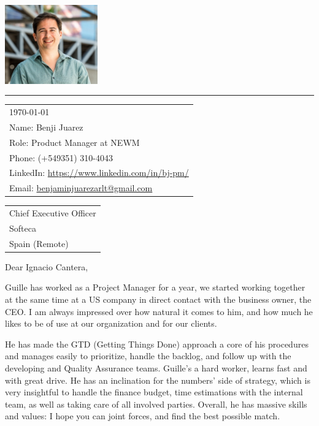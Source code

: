 \documentclass{article}
\begin{document}
\includegraphics[width=0.3\textwidth]{pic.png} %
\rule{0.72\linewidth}{1pt} %
\bigskip\bigskip %
\hfill
\begin{tabular}{l @{}} \today \midskip\\ 
	Name: Benji Juarez \\
	Role: Product Manager at NEWM \\
	Phone: (+549351) 310-4043 \\
	LinkedIn: \href{https://www.linkedin.com/in/bj-pm/?locale=en_US}{https://www.linkedin.com/in/bj-pm/} \\
	Email: \href{benjaminjuarezarlt@gmail.com}{benjaminjuarezarlt@gmail.com} \\
\end{tabular}
\bigskip %

\begin{tabular}{@{} l}
    Chief Executive Officer \\ 
    Softeca \\ 
    Spain (Remote)
\end{tabular}
\bigskip 

Dear Ignacio Cantera,

Guille has worked as a Project Manager for a year, we started working together at the same time at a US company in direct contact with the business owner, the CEO. I am always impressed over how natural it comes to him, and how much he likes to be of use at our organization and for our clients. 

He has made the GTD (Getting Things Done) approach a core of his procedures and manages easily to prioritize, handle the backlog, and follow up with the developing and Quality Assurance teams. Guille's a hard worker, learns fast and with great drive. He has an inclination for the numbers' side of strategy, which is very insightful to handle the finance budget, time estimations with the internal team, as well as taking care of all involved parties. Overall, he has massive skills and values: I hope you can joint forces, and find the best possible match. 
\end{document}
